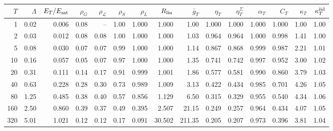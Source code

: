 \begin{tabular}{rrrrrrrrrrrrrrr}
\toprule
$T$ & $\Lambda$ & $E_T/E_{\rm sat}$ & $\rho_G$ & $\rho_{\mathcal L}$ & $\rho_S$ & $\rho_L$ & $R_{\rm lin}$ & $\bar g_T$ & $\eta_T$ & $\eta^\Sigma_T$ & $\alpha_T$ & $C_T$ & $\kappa_T$ & $\kappa^{\rm iid}_T$\\
\midrule
1 & 0.02 & 0.006 & 0.08 & -- & 1.00 & 1.000 & 1.000 & 1.00 & 1.000 & 1.000 & 1.000 & 1.000 & 1.00 & 1.00\\
2 & 0.03 & 0.012 & 0.08 & 0.08 & 1.00 & 1.000 & 1.000 & 1.03 & 0.964 & 0.964 & 1.000 & 0.998 & 1.41 & 1.00\\
5 & 0.08 & 0.030 & 0.07 & 0.07 & 0.99 & 1.000 & 1.000 & 1.14 & 0.867 & 0.868 & 0.999 & 0.987 & 2.21 & 1.01\\
10 & 0.16 & 0.057 & 0.05 & 0.07 & 0.97 & 1.000 & 1.000 & 1.35 & 0.741 & 0.742 & 0.997 & 0.952 & 3.00 & 1.02\\
20 & 0.31 & 0.111 & 0.14 & 0.17 & 0.91 & 0.999 & 1.001 & 1.86 & 0.577 & 0.581 & 0.990 & 0.860 & 3.79 & 1.03\\
40 & 0.63 & 0.228 & 0.28 & 0.30 & 0.73 & 0.989 & 1.009 & 3.13 & 0.422 & 0.434 & 0.985 & 0.701 & 4.26 & 1.05\\
80 & 1.25 & 0.485 & 0.38 & 0.40 & 0.57 & 0.856 & 1.129 & 6.50 & 0.315 & 0.329 & 0.955 & 0.540 & 4.34 & 1.06\\
160 & 2.50 & 0.860 & 0.39 & 0.37 & 0.49 & 0.395 & 2.507 & 21.15 & 0.249 & 0.257 & 0.964 & 0.434 & 4.07 & 1.05\\
320 & 5.01 & 1.021 & 0.12 & 0.12 & 0.17 & 0.091 & 30.502 & 211.35 & 0.205 & 0.207 & 0.973 & 0.396 & 3.81 & 1.04\\
\bottomrule
\end{tabular}
